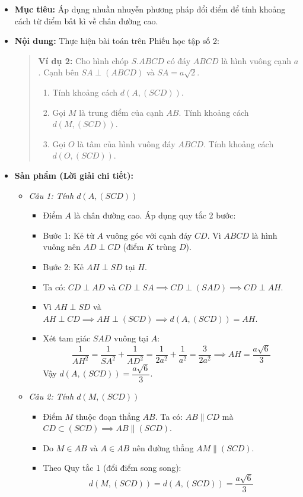 \documentclass[12pt, a4paper]{article}
\begin{document}
\begin{itemize}[leftmargin=1.2cm]
    \item[a)] \textbf{Mục tiêu:} Áp dụng nhuần nhuyễn phương pháp đổi điểm để tính khoảng cách từ điểm bất kì về chân đường cao.
    \item[b)] \textbf{Nội dung:} Thực hiện bài toán trên Phiếu học tập số 2:
    \begin{quote}
        \textbf{Ví dụ 2:} Cho hình chóp $S.ABCD$ có đáy $ABCD$ là hình vuông cạnh $a$. Cạnh bên $SA \perp (ABCD)$ và $SA = a\sqrt{2}$.
        \begin{enumerate}
            \item Tính khoảng cách $d(A, (SCD))$.
            \item Gọi $M$ là trung điểm của cạnh $AB$. Tính khoảng cách $d(M, (SCD))$.
            \item Gọi $O$ là tâm của hình vuông đáy $ABCD$. Tính khoảng cách $d(O, (SCD))$.
        \end{enumerate}
    \end{quote}

    \item[c)] \textbf{Sản phẩm (Lời giải chi tiết):}
    \begin{itemize}[leftmargin=0.6cm]
        \item \textit{Câu 1: Tính $d(A, (SCD))$}
        \begin{itemize}
            \item Điểm $A$ là chân đường cao. Áp dụng quy tắc 2 bước:
            \item Bước 1: Kẻ từ $A$ vuông góc với cạnh đáy $CD$. Vì $ABCD$ là hình vuông nên $AD \perp CD$ (điểm $K$ trùng $D$).
            \item Bước 2: Kẻ $AH \perp SD$ tại $H$.
            \item Ta có: $CD \perp AD$ và $CD \perp SA \implies CD \perp (SAD) \implies CD \perp AH$.
            \item Vì $AH \perp SD$ và $AH \perp CD \implies AH \perp (SCD) \implies d(A, (SCD)) = AH$.
            \item Xét tam giác $SAD$ vuông tại $A$:
            $$\dfrac{1}{AH^2} = \dfrac{1}{SA^2} + \dfrac{1}{AD^2} = \dfrac{1}{2a^2} + \dfrac{1}{a^2} = \dfrac{3}{2a^2} \implies AH = \dfrac{a\sqrt{6}}{3}$$
            Vậy $d(A, (SCD)) = \dfrac{a\sqrt{6}}{3}$.
        \end{itemize}

        \item \textit{Câu 2: Tính $d(M, (SCD))$}
        \begin{itemize}
            \item Điểm $M$ thuộc đoạn thẳng $AB$. Ta có: $AB \parallel CD$ mà $CD \subset (SCD) \implies AB \parallel (SCD)$.
            \item Do $M \in AB$ và $A \in AB$ nên đường thẳng $AM \parallel (SCD)$.
            \item Theo Quy tắc 1 (đổi điểm song song):
            $$d(M, (SCD)) = d(A, (SCD)) = \dfrac{a\sqrt{6}}{3}$$
        \end{itemize}


\end{itemize}
\end{itemize}
\end{document}
